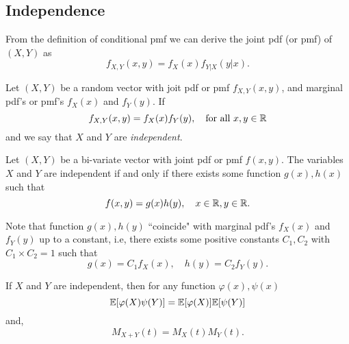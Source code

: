 \subsection{Independence}
From the definition of conditional pmf we can derive the joint pdf (or pmf) of $(X,Y)$ as 
$$
f_{X,Y}(x,y) = f_X(x)f_{Y|X}(y|x).
$$
\begin{definition}[Independent R.V's]
Let $(X,Y)$ be a random vector with joit pdf or pmf $f_{X,Y}(x,y)$, and marginal pdf's or pmf's $f_X(x)$ and $f_Y(y)$. If
$$
f_{X,Y}(x,y) = f_X(x)f_Y(y), \quad \text{for all } x,y \in \mathbb R
$$
and we say that $X$ and $Y$ are \textit{independent}.
\end{definition}

\begin{lemma}
Let $(X,Y)$ be a bi-variate vector with joint pdf or pmf $f(x,y)$. The variables $X$ and $Y$ are independent if and only if there exists some function $g(x),h(x)$ such that
$$
f(x,y) = g(x)h(y), \quad x \in \mathbb R, y \in \mathbb R.
$$
\end{lemma}
Note that function $g(x),h(y)$ ``coincide" with marginal pdf's $f_X(x)$ and $f_Y(y)$ up to a constant, i.e, there exists some positive constants $C_1,C_2$ with $C_1 \times C_2 =1$ such that
$$
g(x) = C_1f_X(x), \quad h(y) = C_2f_Y(y).
$$

\begin{theorem}
If $X$ and $Y$ are independent, then for any function $\varphi(x), \psi(x)$
$$
\mathbb E[\varphi(X)\psi(Y)] = \mathbb E[\varphi(X)]\mathbb E[\psi(Y)]
$$
and,
$$
M_{X+Y}(t) = M_X(t)M_Y(t).
$$
\end{theorem}
